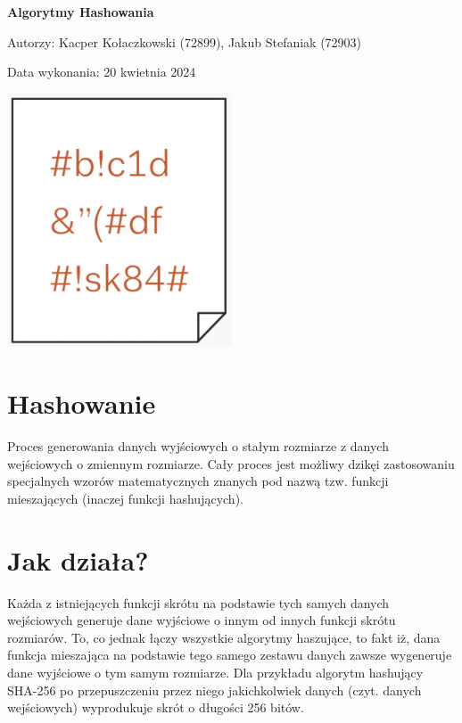 \documentclass[12pt, letterpaper]{article}
\begin{document}
\renewcommand*\contentsname{Spis treści}
\begin{titlepage}
    \centering 
    
    \Huge 
    \textbf{Algorytmy Hashowania} 
    \vspace{1.5cm} %
    
    \Large 
    Autorzy: Kacper Kołaczkowski (72899), Jakub Stefaniak (72903)
    \vspace{1cm} 
    
    Data wykonania: 20 kwietnia 2024 
    \vspace{2cm} 
    
    \includegraphics[width=0.5\textwidth]{hash.png} %
\end{titlepage}
\newpage
\tableofcontents
\newpage

\section{Hashowanie}
Proces generowania danych wyjściowych o stałym rozmiarze z danych wejściowych o zmiennym rozmiarze. Cały proces jest możliwy dzikęi zastosowaniu specjalnych wzorów matematycznych znanych pod nazwą tzw. funkcji mieszających (inaczej funkcji hashujących).

\section{Jak działa?}
Każda z istniejących funkcji skrótu na podstawie tych samych danych wejściowych generuje dane wyjściowe o innym od innych funkcji skrótu rozmiarów. To, co jednak łączy wszystkie algorytmy haszujące, to fakt iż, dana funkcja mieszająca na podstawie tego samego zestawu danych zawsze wygeneruje dane wyjściowe o tym samym rozmiarze. Dla przykładu algorytm hashujący SHA-256 po przepuszczeniu przez niego jakichkolwiek danych (czyt. danych wejściowych) wyprodukuje skrót o długości 256 bitów.
\end{document}
